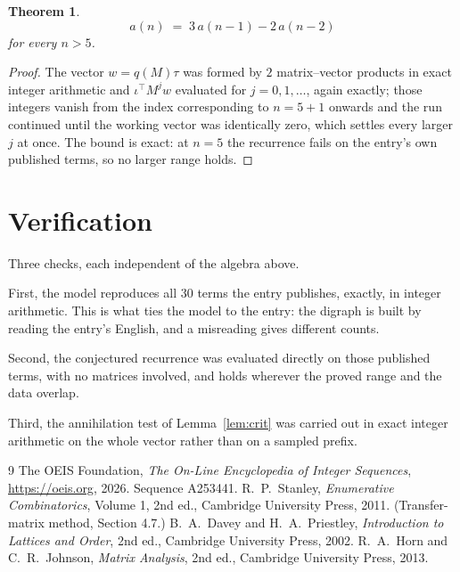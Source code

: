 \documentclass[11pt,a4paper]{article}
\theoremstyle{plain}
\newtheorem{theorem}{Theorem}
\theoremstyle{definition}
\begin{document}
\begin{theorem}
\[
a(n)\;=\;3\,a(n-1) - 2\,a(n-2)
\]
for every $n>5$.
\end{theorem}

\begin{proof}
The vector $w=q(M)\tau$ was formed by $2$ matrix--vector products in exact integer
arithmetic and $\iota^{\!\top}M^{j}w$ evaluated for $j=0,1,\dots$, again exactly; those
integers vanish from the index corresponding to $n=5+1$ onwards and the run continued
until the working vector was identically zero, which settles every larger $j$ at once. The bound is exact: at $n=5$ the recurrence fails on the entry's own published terms, so no larger range holds.
\end{proof}

\section{Verification}

Three checks, each independent of the algebra above.

First, the model reproduces all $30$ terms the entry publishes, exactly, in integer
arithmetic. This is what ties the model to the entry: the digraph is built by reading the
entry's English, and a misreading gives different counts.

Second, the conjectured recurrence was evaluated directly on those published terms, with no
matrices involved, and holds wherever the proved range and the data overlap.

Third, the annihilation test of Lemma~\ref{lem:crit} was carried out in exact integer
arithmetic on the whole vector rather than on a sampled prefix.

\begin{thebibliography}{9}
 The OEIS Foundation, \emph{The On-Line Encyclopedia of Integer
Sequences}, \url{https://oeis.org}, 2026. Sequence A253441.
 R.~P.~Stanley, \emph{Enumerative Combinatorics}, Volume 1, 2nd ed.,
Cambridge University Press, 2011. (Transfer-matrix method, Section 4.7.)
 B.~A.~Davey and H.~A.~Priestley, \emph{Introduction to Lattices and
Order}, 2nd ed., Cambridge University Press, 2002.
 R.~A.~Horn and C.~R.~Johnson, \emph{Matrix Analysis}, 2nd ed., Cambridge
University Press, 2013.
\end{thebibliography}
\end{document}
